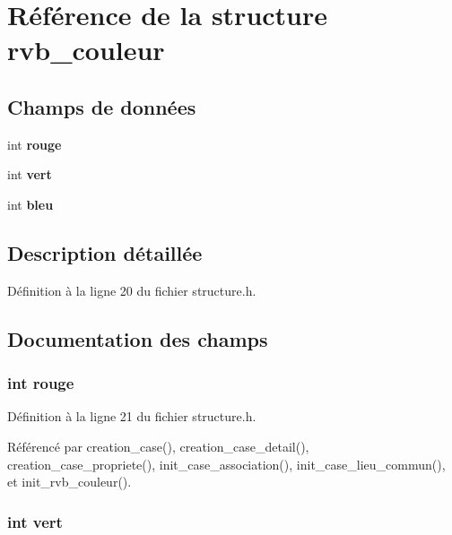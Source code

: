 \section{R\'{e}f\'{e}rence de la structure rvb\_\-couleur}
\label{structrvb__couleur}
\subsection*{Champs de donn\'{e}es}
\begin{CompactItemize}
\item 
int {\bf rouge}
\item 
int {\bf vert}
\item 
int {\bf bleu}
\end{CompactItemize}


\subsection{Description d\'{e}taill\'{e}e}




D\'{e}finition \`{a} la ligne 20 du fichier structure.h.

\subsection{Documentation des champs}
\subsubsection{\setlength{\rightskip}{0pt plus 5cm}int {\bf rouge}}\label{structrvb__couleur_1bd9ee8c34a5177744bb7b2856c33610}




D\'{e}finition \`{a} la ligne 21 du fichier structure.h.

R\'{e}f\'{e}renc\'{e} par creation\_\-case(), creation\_\-case\_\-detail(), creation\_\-case\_\-propriete(), init\_\-case\_\-association(), init\_\-case\_\-lieu\_\-commun(), et init\_\-rvb\_\-couleur().
\subsubsection{\setlength{\rightskip}{0pt plus 5cm}int {\bf vert}}\label{structrvb__couleur_816a7bb71de16d574a2aac953f57f918}





